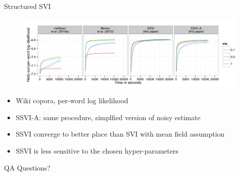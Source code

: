 \documentclass[aspectratio=169]{beamer}
\begin{document}
\begin{frame}{Structured SVI}
    \begin{figure}
        \includegraphics[width=\textwidth]{SSVI.png}
    \end{figure}
    \begin{itemize}
        \item Wiki copora, per-word log likelihood
        \item SSVI-A: same procedure, simplfied version of noisy estimate
        \item SSVI converge to better place than SVI with mean field assumption
        \item SSVI is less sensitive to the chosen hyper-parameters
    \end{itemize}
\end{frame}

\begin{frame}{QA}
    Questions?
\end{frame}
\end{document}

